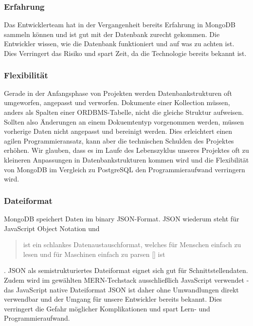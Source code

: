 \subsubsection{Erfahrung}
Das Entwicklerteam hat in der Vergangenheit bereits Erfahrung in MongoDB sammeln können und ist gut mit der Datenbank zurecht gekommen. Die Entwickler wissen, wie die Datenbank funktioniert und auf was zu achten ist. Dies Verringert das Risiko und spart Zeit, da die Technologie bereits bekannt ist.

\subsubsection{Flexibilität}
Gerade in der Anfangsphase von Projekten werden Datenbankstrukturen oft umgeworfen, angepasst und verworfen. Dokumente einer Kollection müssen, anders als Spalten einer ORDBMS-Tabelle, nicht die gleiche Struktur aufweisen. Sollten also Änderungen an einem Dokuemtentyp vorgenommen werden, müssen vorherige Daten nicht angepasst und bereinigt werden. Dies erleichtert einen agilen Programmieransatz, kann aber die technischen Schulden des Projektes erhöhen. Wir glauben, dass es im Laufe des Lebenszyklus unseres Projektes oft zu kleineren Anpassungen in Datenbankstrukturen kommen wird und die Flexibilität von MongoDB im Vergleich zu PostgreSQL den Programmieraufwand verringern wird.

\subsubsection{Dateiformat}
MongoDB speichert Daten im \glqq binary JSON\grqq -Format. JSON wiederum steht für \glqq JavaScript Object Notation \grqq und 
\begin{quote}
    ist ein schlankes Datenaustauschformat, welches für Menschen einfach zu lesen und für Maschinen einfach zu parsen [] ist
\end{quote} \cite{JSON1}. 
JSON als semistrukturiertes Dateiformat eignet sich gut für Schnittstellendaten. Zudem wird im gewählten MERN-Techstack ausschließlich JavaScript verwendet - das JavaScript native Dateiformat JSON ist daher ohne Umwandlungen direkt verwendbar und der Umgang für unsere Entwickler bereits bekannt. Dies verringert die Gefahr möglicher Komplikationen und spart Lern- und Programmieraufwand.

